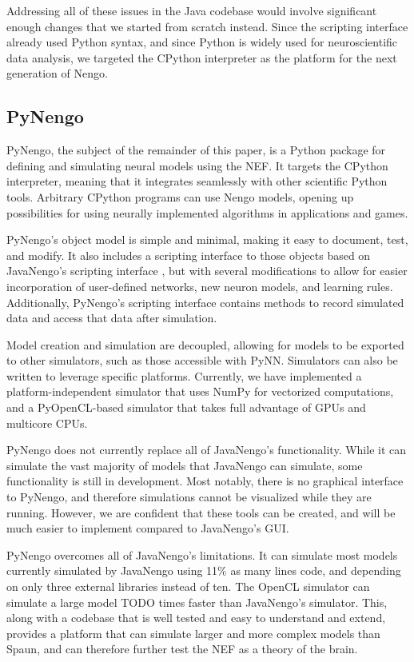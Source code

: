 \documentclass{frontiersSCNS}
\begin{document}
Addressing all of these issues
in the Java codebase would involve
significant enough changes
that we started from scratch instead.
Since the scripting interface
already used Python syntax,
and since Python is widely used
for neuroscientific data analysis,
we targeted the CPython interpreter
as the platform for the next generation of Nengo.

\subsection{PyNengo}

PyNengo,
the subject of the remainder of this paper,
is a Python package for
defining and simulating
neural models using the NEF.
It targets the CPython interpreter,
meaning that it integrates seamlessly
with other scientific Python tools.
Arbitrary CPython programs
can use Nengo models,
opening up possibilities
for using neurally implemented algorithms
in applications and games.

PyNengo's object model is simple and minimal,
making it easy to
document, test, and modify.
It also includes a scripting interface to those objects
based on JavaNengo's scripting interface \cite{TODO},
but with several modifications
to allow for easier incorporation
of user-defined networks,
new neuron models, and learning rules.
Additionally, PyNengo's scripting interface
contains methods to record simulated data
and access that data after simulation.

Model creation and simulation are decoupled,
allowing for models to be exported
to other simulators,
such as those accessible with PyNN.
Simulators can also be written
to leverage specific platforms.
Currently, we have implemented
a platform-independent simulator
that uses NumPy for vectorized computations,
and a PyOpenCL-based
simulator that takes full advantage of GPUs
and multicore CPUs.

PyNengo does not currently
replace all of JavaNengo's functionality.
While it can simulate the vast majority
of models that JavaNengo can simulate,
some functionality is still in development.
Most notably, there is no graphical interface
to PyNengo, and therefore simulations
cannot be visualized while they are running.
However, we are confident that these tools
can be created, and will be much easier
to implement compared to JavaNengo's GUI.

PyNengo overcomes all of JavaNengo's limitations.
It can simulate most models
currently simulated by JavaNengo
using 11\% as many lines code,
and depending on
only three external libraries instead of ten.
The OpenCL simulator can simulate
a large model TODO times
faster than JavaNengo's simulator.
This, along with a codebase
that is well tested and
easy to understand and extend,
provides a platform
that can simulate larger and more complex
models than Spaun,
and can therefore further
test the NEF as a theory of the brain.
\end{document}
